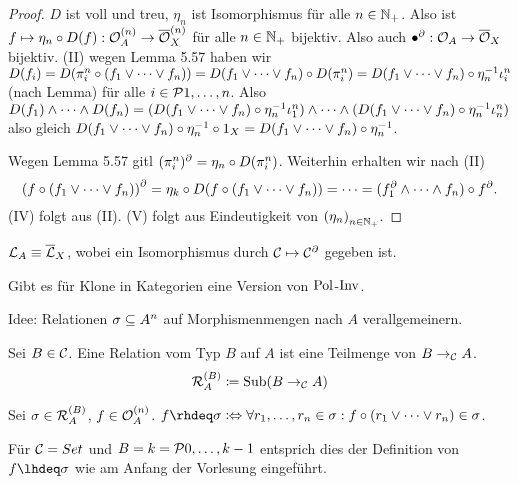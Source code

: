 \documentclass{book}
\begin{document}
\begin{proof}
    $D$ ist voll und treu, $\eta_n$ ist Isomorphismus für alle $n\in\mathbb{N}_+$. Also ist $f\mapsto \eta_n\circ D(f):\mathcal{O}_A^{(n)}\rightarrow\overline{\mathcal{O}}^{(n)}_X$ für alle $n\in\mathbb{N}_+$ bijektiv. Also auch $\bullet^\partial:\mathcal{O}_A\rightarrow\overline{\mathcal{O}}_X$ bijektiv. (II) wegen Lemma 5.57 haben wir $D(f_i)=D(\pi^n_i\circ(f_1\vee\cdots\vee f_n))=D(f_1\vee\cdots\vee f_n)\circ D(\pi^n_i)=D(f_1\vee\cdots\vee f_n)\circ \eta_n^{-1}\iota_i^n$ (nach Lemma) für alle $i\in\set{1,\ldots,n}$. Also $D(f_1)\wedge\cdots\wedge D(f_n)=(D(f_1\vee\cdots\vee f_n)\circ \eta_n^{-1}\iota_1^n)\wedge\cdots\wedge(D(f_1\vee\cdots\vee f_n)\circ \eta_n^{-1}\iota_n^n)$ also gleich $D(f_1\vee\cdots \vee f_n)\circ \eta_n^{-1}\circ 1_X=D(f_1\vee\cdots\vee f_n)\circ \eta^{-1}_n$.
        \item Wegen Lemma 5.57 gitl $(\pi^n_i)^{\partial}=\eta_n\circ D(\pi^n_i)$. Weiterhin erhalten wir nach (II)
    $$
    {(f\circ(f_1\vee\cdots\vee f_n))}^{\partial}=\eta_k\circ D(f\circ(f_1\vee\cdots\vee f_n)) = \cdots = (f_1^\partial\wedge\cdots\wedge f_n)\circ f^{\partial}.
    $$
    (IV) folgt aus (II). (V) folgt aus Eindeutigkeit von ${(\eta_n)}_{n\in\mathbb{N}_+}$.
\end{proof}

\begin{theorem}
    $\cL_A\iso\bar\cL_X$, wobei ein Isomorphismus durch $\mathcal{C}\mapsto\mathcal{C}^\partial$ gegeben ist.
\end{theorem}

Gibt es für Klone in Kategorien eine Version von $\mathop\mathrm{Pol}$-$\mathop\mathrm{Inv}$.

Idee: Relationen $\sigma\subseteq A^n$ auf Morphismenmengen nach $A$ verallgemeinern.

\begin{definition}
    Sei $B\in\mathcal{C}$. Eine Relation vom Typ $B$ auf $A$ ist eine Teilmenge von $B\rightarrow_{\mathcal{C}} A$.
    $$
    \mathcal{R}_A^{(B)}\mathrel{\mathrel{\mathop:}\mkern-1.2mu=}\mathop\mathrm{Sub}\nolimits(B\rightarrow_{\mathcal{C}} A)
    $$
\end{definition}

\begin{definition}
    Sei $\sigma\in\mathcal{R}_A^{(B)}$, $f\in\mathcal{O}_A^{(n)}$. $f\congeq \sigma\defequiv \forall r_1,\ldots,r_n\in\sigma:f\compose(r_1\cotuple\cdots\cotuple r_n)\in\sigma$.
\end{definition}

\begin{example}
    Für $\mathcal{C}=\\Set$ und $B=k=\set{0,\ldots,k-1}$ entsprich dies der Definition von $f\conleq \sigma$ wie am Anfang der Vorlesung eingeführt.
\end{example}
\end{document}
